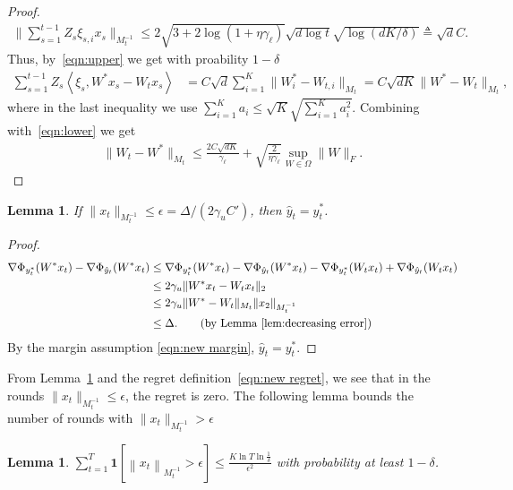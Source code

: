 \documentclass{article}
\newcommand{\one}{\boldsymbol{1}}
\newcommand{\nb}{\nabla}
\newcommand{\inner}[1]{ \left\langle {#1} \right\rangle }
\newcommand{\norm}[1]{\left\|{#1}\right\|}
\newtheorem{lemma}[theorem]{Lemma}
\begin{document}
\begin{proof}
\begin{align*}
    \Bigg\| \sum_{s=1}^{t-1} Z_s\xi_{s,i}x_s \Bigg\|_{M_t^{-1}} \leq 2\sqrt{3+2\log(1+\eta\gamma_\ell)}\sqrt{d\log t}\sqrt{\log(dK/\delta)} \triangleq \sqrt{d}C.
\end{align*}
Thus, by~\eqref{eqn:upper} we get with proability $1-\delta$
\begin{align*}
    \sum_{s=1}^{t-1} Z_s\inner{\xi_s, W^*x_s-W_tx_s} &= C\sqrt{d}\sum_{i=1}^K \|W^*_i-W_{t,i}\|_{M_t} = C\sqrt{dK} \|W^*-W_{t}\|_{M_t}, 
\end{align*}
where in the last inequality we use $\sum_{i=1}^K a_i\leq \sqrt{K}\sqrt{\sum_{i=1}^K a_i^2}$. Combining with~\eqref{eqn:lower} we get 
\begin{align*}
    \|W_t-W^*\|_{M_t} \leq \frac{2C\sqrt{dK}}{\gamma_\ell} + \sqrt{\frac{2}{\eta \gamma_\ell}}\sup_{W\in \Omega}\|W\|_F. 
\end{align*}

\end{proof}



\begin{lemma}
\label{lem: xbounded}
If $\|x_t\|_{M_t^{-1}}\leq \epsilon = \Delta/(2\gamma_u C')$, then $\hat{y}_t=y^*_t$. 
\end{lemma}
\begin{proof}
\begin{align*}
\nb \Phi_{y_t^*}(W^*x_t) - \nb\Phi_{\hat{y}_t}(W^*x_t) 
 &\leq \nb \Phi_{y_t^*}(W^*x_t) -    \nb\Phi_{\hat{y}_t}(W^*x_t) 
 - \nb \Phi_{y_t^*}(W_tx_t) + \nb \Phi_{\hat{y}_t}(W_tx_t) \\
 & \leq 2\gamma_u \|W^*x_t-W_tx_t\|_2 \\
 & \leq 2\gamma_u \|W^*-W_t\|_{M_t}\|x_2\|_{M_t^{-1}} \\
 & \leq \Delta. \tag{by Lemma~\ref{lem:decreasing error}}
\end{align*}
By the margin assumption \eqref{eqn:new margin}, $\hat{y}_t = y_t^*$. 
\end{proof}

From Lemma~\ref{lem: xbounded} and the regret definition~\eqref{eqn:new regret}, we see that in the rounds $\|x_t\|_{M_t^{-1}}\leq \epsilon$, the regret is zero. The following lemma bounds the number of rounds with $\|x_t\|_{M_t^{-1}} > \epsilon $

\begin{lemma}
\label{lem:N}
$ \sum_{t=1}^T \one\left[\norm{x_t}_{M_t^{-1}}> \epsilon\right] \leq \frac{K\ln T\ln \frac{1}{\delta}}{\epsilon^2}$ with probability at least $1-\delta$. 
\end{lemma}
\end{document}
